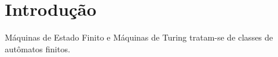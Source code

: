 \section{Introdução}

Máquinas de Estado Finito e Máquinas de Turing tratam-se de classes de
autômatos finitos.